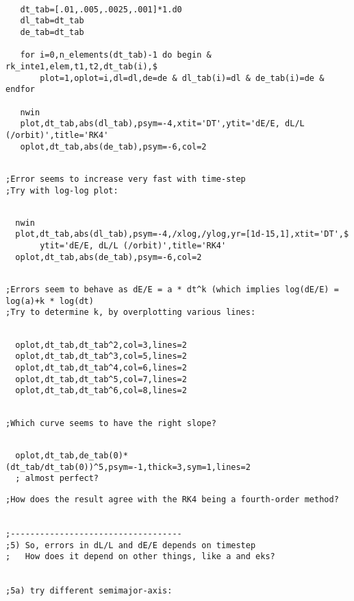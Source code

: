 \documentclass[a4paper,12pt]{article}
\def\red{\color{red}}
\def\black{\color{RGBblack}}
\begin{document}
\red
\begin{verbatim}

   dt_tab=[.01,.005,.0025,.001]*1.d0
   dl_tab=dt_tab
   de_tab=dt_tab

   for i=0,n_elements(dt_tab)-1 do begin &  rk_inte1,elem,t1,t2,dt_tab(i),$
       plot=1,oplot=i,dl=dl,de=de & dl_tab(i)=dl & de_tab(i)=de & endfor

   nwin
   plot,dt_tab,abs(dl_tab),psym=-4,xtit='DT',ytit='dE/E, dL/L (/orbit)',title='RK4'
   oplot,dt_tab,abs(de_tab),psym=-6,col=2

\end{verbatim}
\black
\begin{verbatim}

;Error seems to increase very fast with time-step
;Try with log-log plot:

\end{verbatim}
\red
\begin{verbatim}

  nwin
  plot,dt_tab,abs(dl_tab),psym=-4,/xlog,/ylog,yr=[1d-15,1],xtit='DT',$
       ytit='dE/E, dL/L (/orbit)',title='RK4'
  oplot,dt_tab,abs(de_tab),psym=-6,col=2

\end{verbatim}
\black
\begin{verbatim}

;Errors seem to behave as dE/E = a * dt^k (which implies log(dE/E) = log(a)+k * log(dt)
;Try to determine k, by overplotting various lines:

\end{verbatim}
\red
\begin{verbatim}

  oplot,dt_tab,dt_tab^2,col=3,lines=2
  oplot,dt_tab,dt_tab^3,col=5,lines=2
  oplot,dt_tab,dt_tab^4,col=6,lines=2
  oplot,dt_tab,dt_tab^5,col=7,lines=2
  oplot,dt_tab,dt_tab^6,col=8,lines=2

\end{verbatim}
\black
\begin{verbatim}

;Which curve seems to have the right slope?

\end{verbatim}
\red
\begin{verbatim}

  oplot,dt_tab,de_tab(0)*(dt_tab/dt_tab(0))^5,psym=-1,thick=3,sym=1,lines=2  
  ; almost perfect?

\end{verbatim}
\black
\begin{verbatim}
;How does the result agree with the RK4 being a fourth-order method?


;-----------------------------------
;5) So, errors in dL/L and dE/E depends on timestep
;   How does it depend on other things, like a and eks?


;5a) try different semimajor-axis:

\end{verbatim}
\end{document}
